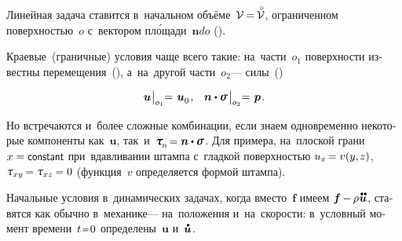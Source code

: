 \begin{otherlanguage}{russian}
Линейная задача ставится в~начальном объёме~\hbox{$\mathcal{V} \hspace{-0.2ex} = \hspace{-0.2ex} \mathcircabove{\mathcal{V}}$\hspace{-0.12em}}, ограниченном поверхностью~$o$ с~вектором пл\'{о}щади~${\bm{n} do}$ ().

Краевые~(граничные) условия чаще всего такие: на~\hbox{части~${o_1}$} поверхности известны перемещения~(), а~на~другой \hbox{части~${o_2}$}\:--- силы~()

\nopagebreak\vspace{-0.2em}\begin{equation}\label{lineartheory:boundaryconditions}
\bm{u} \hspace{.1ex} \bigr|_{o_1} \hspace{-0.64ex} = \hspace{.2ex} \bm{u}_{\raisemath{-0.1em}{0}}
\hspace{.2ex} ,
\hspace{.8em}
\bm{n} \dotp \linearstress \hspace{.2ex} \bigr|_{o_2} \hspace{-0.64ex} = \hspace{.2ex} \bm{p}
\hspace{.2ex} .
\end{equation}

Но встречаются и~более сложные комбинации, если знаем одно\-времен\-но некоторые компоненты как~$\bm{u}$, так~и~${\tractionvector{n} \hspace{-0.2ex} = \bm{n} \dotp \linearstress}$.
Для примера, на~плоской грани~${x = \constant}$ при~вдавливании штампа с~гладкой поверхностью ${u_x \hspace{-0.25ex} = v (y , \hspace{-0.1ex} z)}$, ${\mathtau_{xy} \hspace{-0.2ex} = \mathtau_{xz} \hspace{-0.2ex} = 0}$ (функция~$v$ определяется формой штампа).

Начальные условия в~динамических задачах, когда вместо~$\bm{f}$ имеем ${\bm{f} \hspace{-0.1ex} - \hspace{-0.1ex} \rho \hspace{.1ex} \mathdotdotabove{\bm{u}}}$, ставятся как обычно в~механике\:--- на~положения и~на~скорости: в~условный момент времени~${t \narroweq 0}$ определены~$\bm{u}$ и~$\mathdotabove{\bm{u}}$.


\end{otherlanguage}
